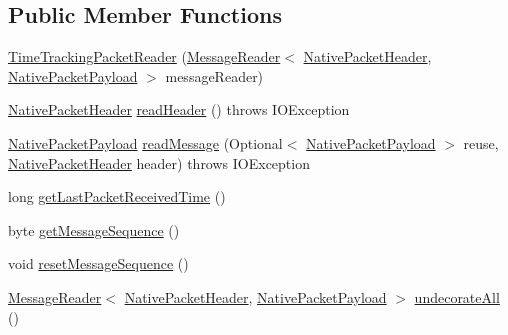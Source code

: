 \subsection*{Public Member Functions}
\begin{DoxyCompactItemize}
\item 
\mbox{\hyperlink{classcom_1_1mysql_1_1cj_1_1protocol_1_1a_1_1_time_tracking_packet_reader_a3ffbfb02e61815c12a359e0f2845766f}{Time\+Tracking\+Packet\+Reader}} (\mbox{\hyperlink{interfacecom_1_1mysql_1_1cj_1_1protocol_1_1_message_reader}{Message\+Reader}}$<$ \mbox{\hyperlink{classcom_1_1mysql_1_1cj_1_1protocol_1_1a_1_1_native_packet_header}{Native\+Packet\+Header}}, \mbox{\hyperlink{classcom_1_1mysql_1_1cj_1_1protocol_1_1a_1_1_native_packet_payload}{Native\+Packet\+Payload}} $>$ message\+Reader)
\item 
\mbox{\hyperlink{classcom_1_1mysql_1_1cj_1_1protocol_1_1a_1_1_native_packet_header}{Native\+Packet\+Header}} \mbox{\hyperlink{classcom_1_1mysql_1_1cj_1_1protocol_1_1a_1_1_time_tracking_packet_reader_aa49a24bf628c8b096b222c6516cb04b3}{read\+Header}} ()  throws I\+O\+Exception 
\item 
\mbox{\hyperlink{classcom_1_1mysql_1_1cj_1_1protocol_1_1a_1_1_native_packet_payload}{Native\+Packet\+Payload}} \mbox{\hyperlink{classcom_1_1mysql_1_1cj_1_1protocol_1_1a_1_1_time_tracking_packet_reader_a6f6c10be80bf6632e4f79e17b893c539}{read\+Message}} (Optional$<$ \mbox{\hyperlink{classcom_1_1mysql_1_1cj_1_1protocol_1_1a_1_1_native_packet_payload}{Native\+Packet\+Payload}} $>$ reuse, \mbox{\hyperlink{classcom_1_1mysql_1_1cj_1_1protocol_1_1a_1_1_native_packet_header}{Native\+Packet\+Header}} header)  throws I\+O\+Exception 
\item 
long \mbox{\hyperlink{classcom_1_1mysql_1_1cj_1_1protocol_1_1a_1_1_time_tracking_packet_reader_a3bd1be8166c894904064c43363adb821}{get\+Last\+Packet\+Received\+Time}} ()
\item 
byte \mbox{\hyperlink{classcom_1_1mysql_1_1cj_1_1protocol_1_1a_1_1_time_tracking_packet_reader_a436548845d1e371699d0cad877dc717b}{get\+Message\+Sequence}} ()
\item 
void \mbox{\hyperlink{classcom_1_1mysql_1_1cj_1_1protocol_1_1a_1_1_time_tracking_packet_reader_a1029b1583cd042d202fa0caa956a13c2}{reset\+Message\+Sequence}} ()
\item 
\mbox{\hyperlink{interfacecom_1_1mysql_1_1cj_1_1protocol_1_1_message_reader}{Message\+Reader}}$<$ \mbox{\hyperlink{classcom_1_1mysql_1_1cj_1_1protocol_1_1a_1_1_native_packet_header}{Native\+Packet\+Header}}, \mbox{\hyperlink{classcom_1_1mysql_1_1cj_1_1protocol_1_1a_1_1_native_packet_payload}{Native\+Packet\+Payload}} $>$ \mbox{\hyperlink{classcom_1_1mysql_1_1cj_1_1protocol_1_1a_1_1_time_tracking_packet_reader_ab320fc6184aad94ebdba7260b574421f}{undecorate\+All}} ()

\end{DoxyCompactItemize}
